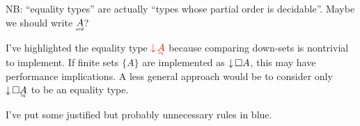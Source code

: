 \documentclass{article}
\begin{document}
NB: ``equality types'' are actually ``types whose partial order is decidable''.
Maybe we should write $\under{ord}{A}$?

I've highlighted the equality type ${\color{red} \Down{\eq{A}}}$ because
comparing down-sets is nontrivial to implement. If finite sets $\{A\}$ are
implemented as ${\downarrow}\,{\square{A}}$, this may have performance implications. A less
general approach would be to consider only $\Down{\Disc{\eq{A}}}$ to be an
equality type.

I've put some justified but probably unnecessary rules in {\color{Cerulean} blue}.













\end{document}
